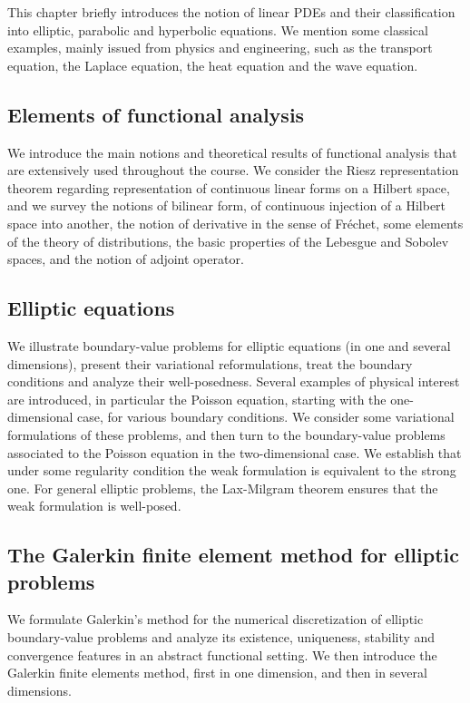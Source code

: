 \documentclass{article}
\begin{document}
This chapter briefly introduces the notion of linear PDEs and their
classification into elliptic, parabolic and hyperbolic  equations. We mention
some classical examples, mainly issued from physics and engineering, such as
the transport equation, the Laplace equation, the heat equation and the wave
equation. 

\subsection{Elements of functional analysis} 

We introduce the main notions and theoretical results of functional analysis
that are extensively used throughout the course. We consider the Riesz
representation theorem regarding representation of continuous linear forms on a
Hilbert space, and we survey the notions of bilinear form, of continuous
injection of a Hilbert space into another, the notion of derivative in the
sense of Fréchet, some elements of the theory of distributions, the basic
properties of the Lebesgue and Sobolev spaces, and the notion of adjoint
operator. 

\subsection{Elliptic equations}

We illustrate boundary-value problems for elliptic equations (in one and
several dimensions), present their variational reformulations, treat the
boundary conditions and analyze their well-posedness. Several examples of
physical interest are introduced, in particular the Poisson equation, starting
with the one-dimensional case, for various boundary conditions. We consider
some variational formulations of these problems, and then turn to the
boundary-value problems associated to the Poisson equation in the
two-dimensional case. We establish that under some regularity condition the
weak formulation is equivalent to the strong one. For general elliptic
problems, the Lax-Milgram theorem  ensures that the weak formulation is
well-posed. 

\subsection{The Galerkin finite element method for elliptic problems}

We formulate Galerkin’s method for the numerical discretization of elliptic
boundary-value problems and analyze its existence, uniqueness, stability and
convergence features  in an abstract functional setting. We then introduce the
Galerkin finite elements method, first in one dimension,  and then in several
dimensions.
\end{document}
